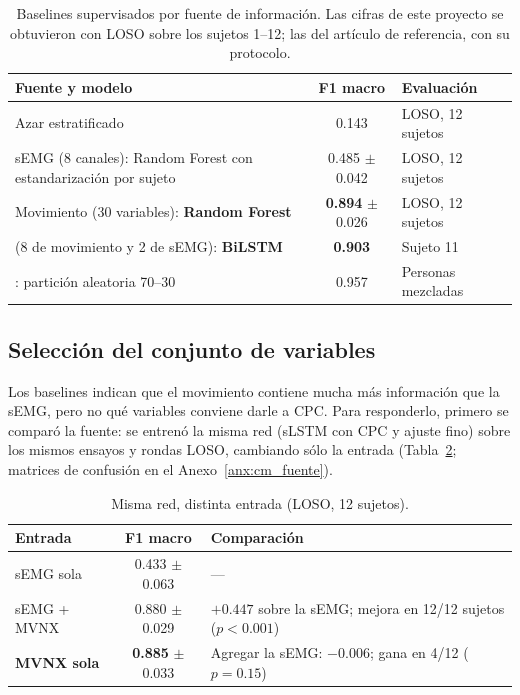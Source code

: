 \documentclass[letterpaper,11pt]{article}
\begin{document}
\begin{table}[H]
  \centering
  \small
  \caption{Baselines supervisados por fuente de información. Las cifras de este proyecto se obtuvieron con LOSO sobre los sujetos 1--12; las del artículo de referencia, con su protocolo.}
  \label{tab:baseline}
  \begin{tabular}{p{9.0cm}c>{\raggedright\arraybackslash}p{3.4cm}}
    \toprule
    Fuente y modelo & F1 macro & Evaluación \\
    \midrule
    Azar estratificado & 0.143 & LOSO, 12 sujetos \\
    sEMG (8 canales): Random Forest con estandarización por sujeto & 0.485 $\pm$ 0.042 & LOSO, 12 sujetos \\
    Movimiento (30 variables): \textbf{Random Forest} & \textbf{0.894} $\pm$ 0.026 & LOSO, 12 sujetos \\
    \textcite{bassani2025} (8 de movimiento y 2 de sEMG): \textbf{BiLSTM} & \textbf{0.903} & Sujeto 11 \\
    \textcite{bassani2025}: partición aleatoria 70--30 & 0.957 & Personas mezcladas \\
    \bottomrule
  \end{tabular}
\end{table}

\subsection{Selección del conjunto de variables}
\label{sec:fuente}
Los baselines indican que el movimiento contiene mucha más información que la sEMG, pero no qué variables conviene darle a CPC. Para responderlo, primero se comparó la fuente: se entrenó la misma red (sLSTM con CPC y ajuste fino) sobre los mismos ensayos y rondas LOSO, cambiando sólo la entrada (Tabla~\ref{tab:fuente}; matrices de confusión en el Anexo~\ref{anx:cm_fuente}).

\begin{table}[H]
  \centering
  \small
  \caption{Misma red, distinta entrada (LOSO, 12 sujetos).}
  \label{tab:fuente}
  \begin{tabular}{lcl}
    \toprule
    Entrada & F1 macro & Comparación \\
    \midrule
    sEMG sola          & 0.433 $\pm$ 0.063 & --- \\
    sEMG + MVNX        & 0.880 $\pm$ 0.029 & $+0.447$ sobre la sEMG; mejora en 12/12 sujetos ($p < 0.001$) \\
    \textbf{MVNX sola} & \textbf{0.885} $\pm$ 0.033 & Agregar la sEMG: $-0.006$; gana en 4/12 ($p = 0.15$) \\
    \bottomrule
  \end{tabular}
\end{table}
\end{document}
